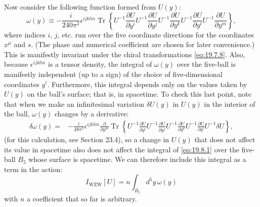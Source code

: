 Now consider the following function formed from $U(y)$:
\begin{equation}
\omega(y)\equiv
-\frac{i}{240\pi^2}\epsilon^{ijklm}
\operatorname{Tr}\left\{
U^{-1}\frac{\partial U}{\partial y^i}
U^{-1}\frac{\partial U}{\partial y^j}
U^{-1}\frac{\partial U}{\partial y^k}
U^{-1}\frac{\partial U}{\partial y^l}
U^{-1}\frac{\partial U}{\partial y^m}
\right\},
\tag{19.8.1}\label{eq:19.8.1}
\end{equation}
where indices $i$, $j$, etc. run over the five coordinate directions for the coordinates $x^\mu$ and $s$. (The phase and numerical coefficient are chosen for later convenience.) This is manifestly invariant under the chiral transformations \eqref{eq:19.7.8}. Also, because $\epsilon^{ijklm}$ is a tensor density, the integral of $\omega(y)$ over the five-ball is manifestly independent (up to a sign) of the choice of five-dimensional coordinates $y^i$. Furthermore, this integral depends only on the values taken by $U(y)$ on the ball's surface; that is, in spacetime. To check this last point, note that when we make an infinitesimal variation $\delta U(y)$ in $U(y)$ in the interior of the ball, $\omega(y)$ changes by a derivative:
\begin{align}
\delta\omega(y)
={}&-\frac{i}{48\pi^2}\epsilon^{ijklm}
\frac{\partial}{\partial y^m}
\operatorname{Tr}\left\{
U^{-1}\frac{\partial U}{\partial y^i}
U^{-1}\frac{\partial U}{\partial y^j}
U^{-1}\frac{\partial U}{\partial y^k}
U^{-1}\frac{\partial U}{\partial y^l}
U^{-1}\delta U
\right\},
\tag{19.8.2}\label{eq:19.8.2}
\end{align}
(for this calculation, see Section 23.4), so a change in $U(y)$ that does not affect its value in spacetime also does not affect the integral of \eqref{eq:19.8.1} over the five-ball $B_5$ whose surface is spacetime. We can therefore include this integral as a term in the action:
\begin{equation}
I_{\mathrm{WZW}}[U]
=n\int_{B_5}d^5y\,\omega(y)
\tag{19.8.3}\label{eq:19.8.3}
\end{equation}
with $n$ a coefficient that so far is arbitrary.

